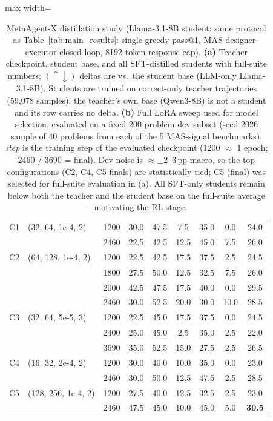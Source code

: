\documentclass{article} %
\begin{document}
\begin{table}[t]
\begin{adjustbox}{max width=\columnwidth}
\begin{tabular}{llc|ccccc|c}
\midrule
C1 & (32, 64, 1e-4, 2) & 1200 & 30.0 & 47.5 & 7.5 & 35.0 & 0.0 & 24.0 \\
   &                    & 2460 & 22.5 & 42.5 & 12.5 & 45.0 & 7.5 & 26.0 \\
\midrule
C2 & (64, 128, 1e-4, 2) & 1200 & 22.5 & 42.5 & 17.5 & 37.5 & 2.5 & 24.5 \\
   &                    & 1800 & 27.5 & 50.0 & 12.5 & 32.5 & 7.5 & 26.0 \\
   &                    & 2000 & 42.5 & 47.5 & 17.5 & 40.0 & 0.0 & 29.5 \\
   &                    & 2460 & 30.0 & 52.5 & 20.0 & 30.0 & 10.0 & 28.5 \\
\midrule
C3 & (32, 64, 5e-5, 3)  & 1200 & 22.5 & 45.0 & 17.5 & 37.5 & 0.0 & 24.5 \\
   &                    & 2400 & 25.0 & 45.0 & 2.5 & 35.0 & 2.5 & 22.0 \\
   &                    & 3690 & 35.0 & 52.5 & 15.0 & 27.5 & 2.5 & 26.5 \\
\midrule
C4 & (16, 32, 2e-4, 2)  & 1200 & 30.0 & 40.0 & 10.0 & 35.0 & 0.0 & 23.0 \\
   &                    & 2460 & 30.0 & 50.0 & 12.5 & 47.5 & 2.5 & 28.5 \\
\midrule
C5 & (128, 256, 1e-4, 2) & 1200 & 27.5 & 40.0 & 12.5 & 32.5 & 2.5 & 23.0 \\
   &                     & 2460 & 47.5 & 45.0 & 10.0 & 45.0 & 5.0 & \textbf{30.5} \\
\bottomrule
\end{tabular}
\end{adjustbox}
\caption{MetaAgent-X distillation study (Llama-3.1-8B student; same protocol as
Table~\ref{tab:main_results}: single greedy pass@1, MAS designer--executor closed loop,
8192-token response cap). \textbf{(a)} Teacher checkpoint, student base, and all
SFT-distilled students with full-suite numbers; $(\uparrow\downarrow)$ deltas are vs.\ the
student base (LLM-only Llama-3.1-8B). Students are trained on correct-only teacher
trajectories (59{,}078 samples); the teacher's own base (Qwen3-8B) is not a student and its
row carries no delta. \textbf{(b)} Full LoRA sweep used for model selection, evaluated on a
fixed 200-problem dev subset (seed-2026 sample of 40 problems from each of the 5
MAS-signal benchmarks); \emph{step} is the training step of the evaluated checkpoint
(1200 $\approx$ 1 epoch; 2460 / 3690 = final). Dev noise is $\approx\pm$2--3\,pp macro,
so the top configurations (C2, C4, C5 finals) are statistically tied; C5 (final) was
selected for full-suite evaluation in (a). All SFT-only students remain below both the
teacher and the student base on the full-suite average---motivating the RL stage.}
\label{tab:distill_sft}
\end{table}
\end{document}
